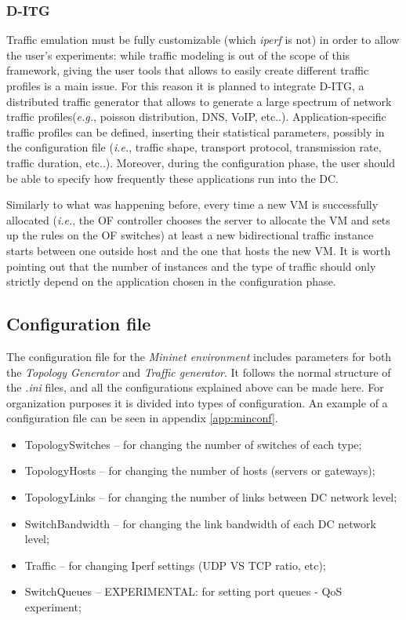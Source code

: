 \documentclass[12pt,english,oneside]{book}
\begin{document}
\subsubsection{D-ITG}
\hspace{0.6cm}

Traffic emulation must be fully customizable (which \textit{iperf} is not) in order to allow the user's experiments: while traffic modeling is out of the scope of this framework, giving the user tools that allows to easily create different traffic profiles is a main issue.
For this reason it is planned to integrate D-ITG\cite{gitg}, a distributed traffic generator that allows to generate a large spectrum of network traffic profiles({\it e.g.}, poisson distribution, DNS, VoIP, etc..).
Application-specific traffic profiles can be defined, inserting their statistical parameters, possibly in the configuration file ({\it i.e.}, traffic shape, transport protocol, transmission rate, traffic duration, etc..).
Moreover, during the configuration phase, the user should be able to specify how frequently these applications run into the DC.

Similarly to what was happening before, every time a new VM is successfully allocated ({\it i.e.}, the OF controller chooses the server to allocate the VM and sets up the rules on the OF switches) at least a new bidirectional traffic instance starts between one outside host and the one that hosts the new VM.
It is worth pointing out that the number of instances and the type of traffic should only strictly depend on the application chosen in the configuration phase.

\subsection{Configuration file}
\hspace{0.6cm}

The configuration file for the \textit{Mininet environment} includes parameters for both the \textit{Topology Generator} and \textit{Traffic generator}.
It follows the normal structure of the \textit{.ini} files, and all the configurations explained above can be made here. For organization purposes it is divided into types of configuration. An example of a configuration file can be seen in appendix \ref{app:minconf}.

\begin{itemize}
  \item TopologySwitches -- for changing the number of switches of each type;
  \item TopologyHosts -- for changing the number of hosts (servers or gateways);
  \item TopologyLinks -- for changing the number of links between DC network level;
  \item SwitchBandwidth -- for changing the link bandwidth of each DC network level;
  \item Traffic -- for changing Iperf settings (UDP VS TCP ratio, etc);
  \item SwitchQueues -- EXPERIMENTAL: for setting port queues - QoS experiment;
\end{itemize}
\end{document}

